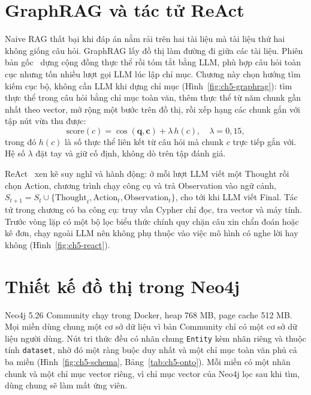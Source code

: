 
\section{GraphRAG và tác tử ReAct}

Naive RAG thất bại khi đáp án nằm rải trên hai tài liệu mà tài liệu thứ hai không giống câu hỏi. GraphRAG lấy đồ thị làm đường đi giữa các tài liệu. Phiên bản gốc~\cite{ch5graphrag} dựng cộng đồng thực thể rồi tóm tắt bằng LLM, phù hợp câu hỏi toàn cục nhưng tốn nhiều lượt gọi LLM lúc lập chỉ mục. Chương này chọn hướng tìm kiếm cục bộ, không cần LLM khi dựng chỉ mục (Hình~\ref{fig:ch5-graphrag}): tìm thực thể trong câu hỏi bằng chỉ mục toàn văn, thêm thực thể từ năm chunk gần nhất theo vector, mở rộng một bước trên đồ thị, rồi xếp hạng các chunk gắn với tập nút vừa thu được:
\begin{equation}
\text{score}(c) = \cos(\mathbf{q}, \mathbf{c}) + \lambda\, h(c),\quad \lambda = 0{,}15,
\end{equation}
trong đó $h(c)$ là số thực thể liên kết từ câu hỏi mà chunk $c$ trực tiếp gắn với. Hệ số $\lambda$ đặt tay và giữ cố định, không dò trên tập đánh giá.


ReAct~\cite{ch5react} xen kẽ suy nghĩ và hành động: ở mỗi lượt LLM viết một Thought rồi chọn Action, chương trình chạy công cụ và trả Observation vào ngữ cảnh, $S_{t+1} = S_t \cup \{\text{Thought}_t, \text{Action}_t, \text{Observation}_t\}$, cho tới khi LLM viết Final. Tác tử trong chương có ba công cụ: truy vấn Cypher chỉ đọc, tra vector và máy tính. Trước vòng lặp có một bộ lọc biểu thức chính quy chặn câu xin chẩn đoán hoặc kê đơn, chạy ngoài LLM nên không phụ thuộc vào việc mô hình có nghe lời hay không (Hình~\ref{fig:ch5-react}).


\section{Thiết kế đồ thị trong Neo4j}

Neo4j 5.26 Community chạy trong Docker, heap 768 MB, page cache 512 MB. Mọi miền dùng chung một cơ sở dữ liệu vì bản Community chỉ có một cơ sở dữ liệu người dùng. Nút tri thức đều có nhãn chung \texttt{Entity} kèm nhãn riêng và thuộc tính \texttt{dataset}, nhờ đó một ràng buộc duy nhất và một chỉ mục toàn văn phủ cả ba miền (Hình~\ref{fig:ch5-schema}, Bảng~\ref{tab:ch5-onto}). Mỗi miền có một nhãn chunk và một chỉ mục vector riêng, vì chỉ mục vector của Neo4j lọc sau khi tìm, dùng chung sẽ làm mất ứng viên.

